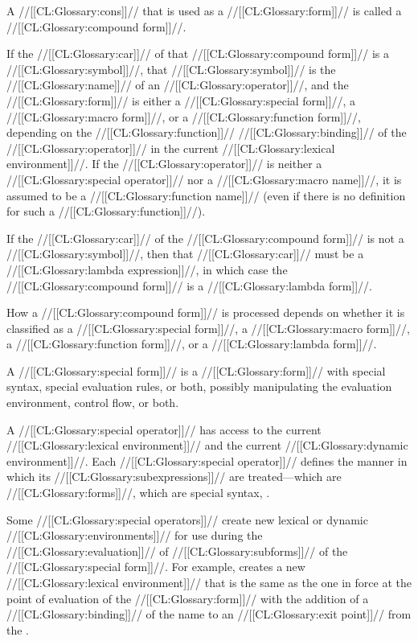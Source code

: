 \endsubsubsubsubsection%

\endsubsubsubsection%


A //[[CL:Glossary:cons]]// that is used as a //[[CL:Glossary:form]]// is called a //[[CL:Glossary:compound form]]//.

If the //[[CL:Glossary:car]]// of that //[[CL:Glossary:compound form]]// is a //[[CL:Glossary:symbol]]//,  that //[[CL:Glossary:symbol]]// is the //[[CL:Glossary:name]]// of an //[[CL:Glossary:operator]]//, and the //[[CL:Glossary:form]]// is either a //[[CL:Glossary:special form]]//, a //[[CL:Glossary:macro form]]//, or a //[[CL:Glossary:function form]]//, depending on the //[[CL:Glossary:function]]// //[[CL:Glossary:binding]]//  of the //[[CL:Glossary:operator]]// in the current //[[CL:Glossary:lexical environment]]//. If the //[[CL:Glossary:operator]]// is neither a //[[CL:Glossary:special operator]]// nor a //[[CL:Glossary:macro name]]//, it is assumed to be a //[[CL:Glossary:function name]]// (even if there is no definition for such a //[[CL:Glossary:function]]//).

If the //[[CL:Glossary:car]]// of the //[[CL:Glossary:compound form]]// is not a //[[CL:Glossary:symbol]]//, then that //[[CL:Glossary:car]]// must be a //[[CL:Glossary:lambda expression]]//, in which case the //[[CL:Glossary:compound form]]// is a //[[CL:Glossary:lambda form]]//.

How a //[[CL:Glossary:compound form]]// is processed depends on whether it is  classified as a //[[CL:Glossary:special form]]//, a //[[CL:Glossary:macro form]]//,  a //[[CL:Glossary:function form]]//, or a //[[CL:Glossary:lambda form]]//.


A //[[CL:Glossary:special form]]// is a //[[CL:Glossary:form]]// with special syntax, special evaluation rules, or both, possibly manipulating the evaluation environment, control flow, or both.

A //[[CL:Glossary:special operator]]// has access to
    the current //[[CL:Glossary:lexical environment]]//  and the current //[[CL:Glossary:dynamic environment]]//. Each //[[CL:Glossary:special operator]]// defines the manner in which its //[[CL:Glossary:subexpressions]]// are treated---which are //[[CL:Glossary:forms]]//, which are special syntax, \etc.

Some //[[CL:Glossary:special operators]]// create new  lexical or dynamic //[[CL:Glossary:environments]]// for use during the  //[[CL:Glossary:evaluation]]// of //[[CL:Glossary:subforms]]// of the //[[CL:Glossary:special form]]//.  For example,  creates a new //[[CL:Glossary:lexical environment]]// that is the same as the one in force at the point of evaluation of the  //[[CL:Glossary:form]]// with the addition of a //[[CL:Glossary:binding]]// of the  name to an //[[CL:Glossary:exit point]]// from the .

